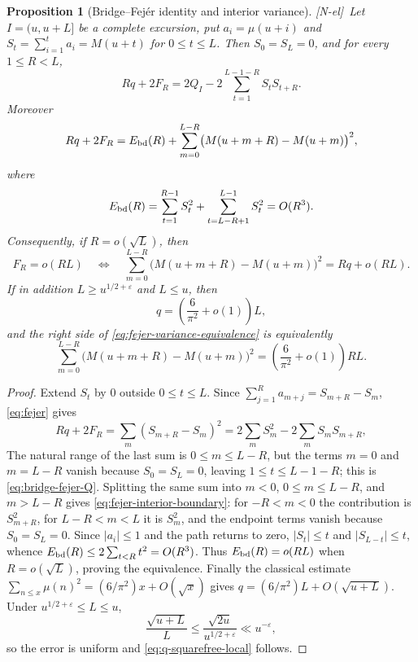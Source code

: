 \documentclass[11pt,reqno]{amsart}
\numberwithin{equation}{section}
\theoremstyle{plain}
\newtheorem{proposition}[theorem]{Proposition}
\theoremstyle{definition}
\theoremstyle{remark}
\newcommand{\eps}{\varepsilon}
\newcommand{\tagNE}{\textup{[N-el]}}
\begin{document}
\begin{proposition}[Bridge--Fej\'er identity and interior variance]
\label{prop:bridge-fejer}
\tagNE\ Let $I=(u,u+L]$ be a complete excursion, put
$a_i=\mu(u+i)$ and
$S_t=\sum_{i=1}^ta_i=M(u+t)$ for $0\le t\le L$. Then
$S_0=S_L=0$, and for every $1\le R<L$,
\begin{equation}
\label{eq:bridge-fejer-Q}
Rq+2F_R
=2Q_I-2\sum_{t=1}^{L-1-R}S_tS_{t+R}.
\end{equation}
Moreover
\begin{equation}
\label{eq:fejer-interior-boundary}
Rq+2F_R
=E_{\rm bd}(R)
+\sum_{m=0}^{L-R}\bigl(M(u+m+R)-M(u+m)\bigr)^2,
\end{equation}
where
\begin{equation}
E_{\rm bd}(R)=\sum_{t=1}^{R-1}S_t^2
+\sum_{t=L-R+1}^{L-1}S_t^2
=O(R^3).
\end{equation}
Consequently, if $R=o(\sqrt L)$, then
\begin{equation}
\label{eq:fejer-variance-equivalence}
F_R=o(RL)
\quad\Longleftrightarrow\quad
\sum_{m=0}^{L-R}\bigl(M(u+m+R)-M(u+m)\bigr)^2
=Rq+o(RL).
\end{equation}
If in addition $L\ge u^{1/2+\eps}$ and $L\le u$, then
\begin{equation}
\label{eq:q-squarefree-local}
q=\left(\frac6{\pi^2}+o(1)\right)L,
\end{equation}
and the right side of \eqref{eq:fejer-variance-equivalence} is equivalently
\begin{equation}
\label{eq:local-variance-diagonal}
\sum_{m=0}^{L-R}\bigl(M(u+m+R)-M(u+m)\bigr)^2
=\left(\frac6{\pi^2}+o(1)\right)RL.
\end{equation}
\end{proposition}

\begin{proof}
Extend $S_t$ by $0$ outside $0\le t\le L$. Since
$\sum_{j=1}^Ra_{m+j}=S_{m+R}-S_m$, \eqref{eq:fejer} gives
\begin{equation}
Rq+2F_R=\sum_m(S_{m+R}-S_m)^2
=2\sum_mS_m^2-2\sum_mS_mS_{m+R},
\end{equation}
The natural range of the last sum is $0\le m\le L-R$, but the terms
$m=0$ and $m=L-R$ vanish because $S_0=S_L=0$, leaving $1\le t\le L-1-R$;
this is \eqref{eq:bridge-fejer-Q}. Splitting the same sum into $m<0$, $0\le m\le L-R$, and $m>L-R$
gives \eqref{eq:fejer-interior-boundary}: for $-R<m<0$ the contribution is
$S_{m+R}^2$, for $L-R<m<L$ it is $S_m^2$, and the endpoint terms vanish
because $S_0=S_L=0$.  Since $|a_i|\le1$ and the path returns
to zero, $|S_t|\le t$ and $|S_{L-t}|\le t$, whence
$E_{\rm bd}(R)\le2\sum_{t<R}t^2=O(R^3)$. Thus
$E_{\rm bd}(R)=o(RL)$ when $R=o(\sqrt L)$, proving the equivalence.
Finally the classical estimate
$\sum_{n\le x}\mu(n)^2=(6/\pi^2)x+O(\sqrt x)$ gives
$q=(6/\pi^2)L+O(\sqrt{u+L})$.  Under
$u^{1/2+\eps}\le L\le u$,
\begin{equation}
 \frac{\sqrt{u+L}}{L}\le
 \frac{\sqrt{2u}}{u^{1/2+\eps}}\ll u^{-\eps},
\end{equation}
so the error is uniform and \eqref{eq:q-squarefree-local} follows.
\end{proof}
\end{document}

